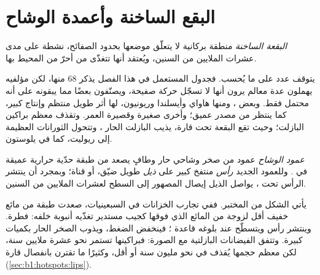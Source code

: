 \section{البقع الساخنة وأعمدة الوشاح}\label{sec:b1:hotspots:plumes}

\begin{definition}\label{def:b1:hotspots:hotspot}
\emph{البقعة الساخنة} منطقة بركانية لا يتعلّق موضعها بحدود الصفائح، نشطة على مدى عشرات الملايين من السنين، ويُعتقد أنها تتغذّى من  أحرّ من  المحيط بها.
\end{definition}

يتوقف عدد  على ما يُحسب. فجدول  المستعمل في هذا الفصل يذكر 68 منها، لكن مؤلفيه يهملون عدة معالم يرون أنها لا تسجّل حركة صفيحة، ويصنّفون بعضًا مما يبقونه على أنه محتمل فقط. وبعض ، ومنها هاواي وأيسلندا وريونيون، لها أثر طويل منتظم وإنتاج كبير، كما ينتظر من مصدر عميق؛ وأخرى صغيرة وقصيرة العمر. وتقذف معظم براكين  البازلت؛ وحيث تقع البقعة تحت قارة، يذيب البازلت الحار ، وتتحول الثورانات العظيمة إلى ريوليت، كما في يلوستون.

\begin{definition}\label{def:b1:hotspots:plume}
\emph{عمود الوشاح} عمود من صخر وشاحي حار وطافٍ يصعد من طبقة حدّية حرارية عميقة في . وللعمود الجديد \emph{رأس} منتفخ كبير على \emph{ذيل} طويل ضيّق، أو قناة؛ وبمجرد أن ينتشر الرأس تحت ، يواصل الذيل إيصال المصهور إلى السطح لعشرات الملايين من السنين.
\end{definition}

يأتي الشكل من المختبر. ففي تجارب الخزانات في السبعينيات، صعدت طبقة من مائع خفيف أقل لزوجة من المائع الذي فوقها كجيب مستدير تغذّيه أنبوبة خلفه: فطرة. وينتشر رأس  ويتسطّح عند بلوغه قاعدة ؛ فينخفض الضغط، ويذوب الصخر الحار بكميات كبيرة. وتتفق الفيضانات البازلتية مع الصورة: فبراكينها تستمر نحو عشرة ملايين سنة، لكن معظم حجمها يُقذف في نحو مليون سنة أو أقل، وكثيرًا ما تقترن بانفصال قارة (\cref{sec:b1:hotspots:lips}).

